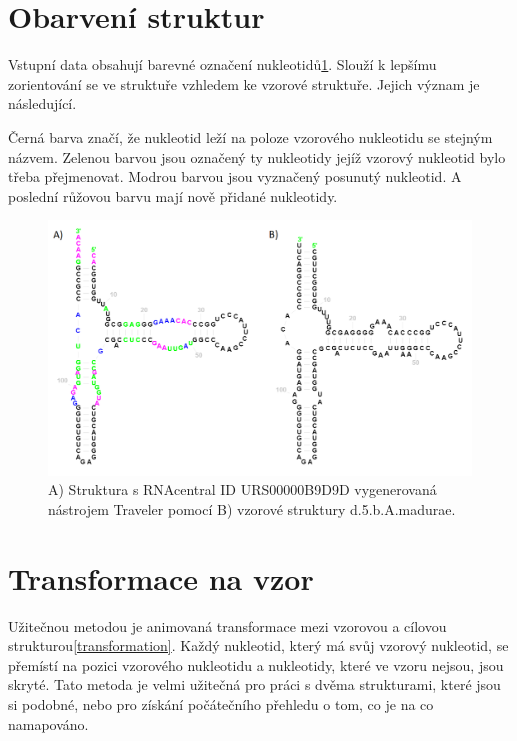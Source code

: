 \section{Obarvení struktur}

Vstupní data obsahují barevné označení nukleotidů\ref{coloring}. Slouží k
lepšímu zorientování se ve struktuře vzhledem ke vzorové struktuře. Jejich
význam je následující.

Černá barva značí, že nukleotid leží na poloze vzorového nukleotidu se stejným
názvem. Zelenou barvou jsou označený ty nukleotidy jejíž vzorový nukleotid bylo
třeba přejmenovat. Modrou barvou jsou vyznačený posunutý nukleotid. A poslední
růžovou barvu mají nově přidané nukleotidy.

\begin{figure}[H]
  \centering
  \includegraphics[width=140mm]{../img/kap03/inputDataColors.png}
  \caption[Vygenerovaná struktura vedle se vzorovou]{A) Struktura s RNAcentral
  ID URS00000B9D9D vygenerovaná nástrojem Traveler pomocí B) vzorové struktury
  d.5.b.A.madurae.}
  \label{coloring}
\end{figure}

\section{Transformace na vzor}

Užitečnou metodou je animovaná transformace mezi vzorovou a cílovou
strukturou\ref{transformation}. Každý nukleotid, který má svůj vzorový
nukleotid, se přemístí na pozici vzorového nukleotidu a nukleotidy, které ve
vzoru nejsou, jsou skryté. Tato metoda je velmi užitečná pro práci s dvěma
strukturami, které jsou si podobné, nebo pro získání počátečního přehledu o
tom, co je na co namapováno. 

